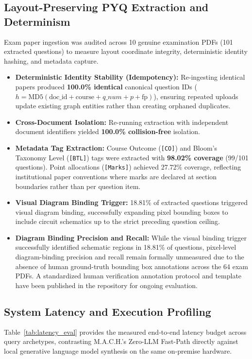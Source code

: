 \documentclass[conference]{IEEEtran}
\begin{document}
\subsection{Layout-Preserving PYQ Extraction and Determinism}
Exam paper ingestion was audited across 10 genuine examination PDFs (101 extracted questions) to measure layout coordinate integrity, deterministic identity hashing, and metadata capture.
\begin{itemize}
    \item \textbf{Deterministic Identity Stability (Idempotency):} Re-ingesting identical papers produced \textbf{100.0\% identical} canonical question IDs ($h = \text{MD5}(\text{doc\_id} + \text{course} + q\_num + p + \text{fp})$), ensuring repeated uploads update existing graph entities rather than creating orphaned duplicates.
    \item \textbf{Cross-Document Isolation:} Re-running extraction with independent document identifiers yielded \textbf{100.0\% collision-free} isolation.
    \item \textbf{Metadata Tag Extraction:} Course Outcome (\texttt{[CO]}) and Bloom's Taxonomy Level (\texttt{[BTL]}) tags were extracted with \textbf{98.02\% coverage} (99/101 questions). Point allocations (\texttt{[Marks]}) achieved 27.72\% coverage, reflecting institutional paper conventions where marks are declared at section boundaries rather than per question item.
    \item \textbf{Visual Diagram Binding Trigger:} 18.81\% of extracted questions triggered visual diagram binding, successfully expanding pixel bounding boxes to include circuit schematics up to the strict preceding question ceiling.
    \item \textbf{Diagram Binding Precision and Recall:} While the visual binding trigger successfully identified schematic regions in 18.81\% of questions, pixel-level diagram-binding precision and recall remain formally unmeasured due to the absence of human ground-truth bounding box annotations across the 64 exam PDFs. A standardized human verification annotation protocol and template have been published in the repository for ongoing evaluation.
\end{itemize}

\subsection{System Latency and Execution Profiling}
Table~\ref{tab:latency_eval} provides the measured end-to-end latency budget across query archetypes, contrasting M.A.C.H.'s Zero-LLM Fast-Path directly against local generative language model synthesis on the same on-premise hardware.
\end{document}
